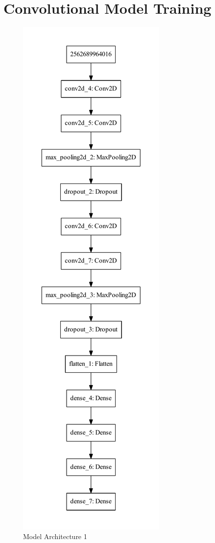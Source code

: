 \pagebreak
\section{Convolutional Model Training}

\begin{figure}
    \centering
    \includegraphics[height=.9\textheight]{Documents/model.pdf}
    \caption{Model Architecture 1}
\end{figure}
